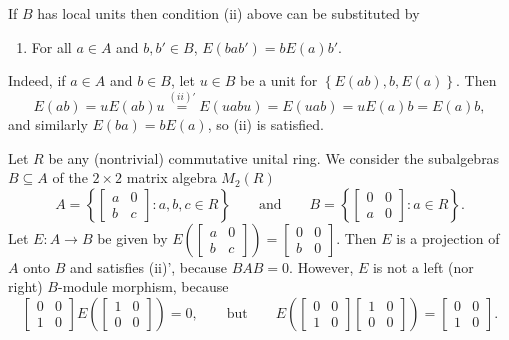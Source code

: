 \begin{remark}
If $B$ has local units then condition (ii) above can be substituted by
\begin{enumerate}
\item[(ii)'] For all $a\in A$ and $b,b'\in B$, $E(bab')=bE(a)b'$.
\end{enumerate}
Indeed, if $a\in A$ and $b\in B$, let $u\in B$ be a unit for $\left\{E(ab),b,E(a)\right\}$. Then
\[E(ab)=uE(ab)u\overset{(ii)'}{=}E(uabu)=E(uab)=uE(a)b=E(a)b,\]
and similarly $E(ba)=bE(a)$, so (ii) is satisfied.
\end{remark}

\begin{example}
Let $R$ be any (nontrivial) commutative unital ring. We consider the subalgebras $B\subseteq A$ of the $2\times 2$ matrix algebra $M_2(R)$
\[A=\left\{\begin{bmatrix}a&0\\b&c\end{bmatrix}:a,b,c\in R\right\}\qquad\text{and}\qquad B=\left\{\begin{bmatrix}0&0\\a&0\end{bmatrix}:a\in R\right\}.\]
Let $E:A\to B$ be given by $E\left(\begin{bmatrix}a&0\\b&c\end{bmatrix}\right)=\begin{bmatrix}0&0\\b&0\end{bmatrix}$. Then $E$ is a projection of $A$ onto $B$ and satisfies (ii)', because $BAB=0$. However, $E$ is not a left (nor right) $B$-module morphism, because
\[\begin{bmatrix}0&0\\1&0\end{bmatrix}E\left(\begin{bmatrix}1&0\\0&0\end{bmatrix}\right)=0,\qquad\text{but}\qquad E\left(\begin{bmatrix}0&0\\1&0\end{bmatrix}\begin{bmatrix}1&0\\0&0\end{bmatrix}\right)=\begin{bmatrix}0&0\\1&0\end{bmatrix}.\]
\end{example}

